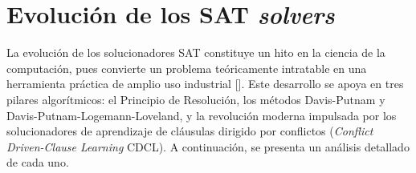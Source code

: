 




\section{Evoluci\'on de los SAT \textit{solvers}}
\label{sec:evolucion-sat-solvers}
La evoluci\'on de los solucionadores SAT constituye un hito en la ciencia de la computaci\'on, pues convierte un problema te\'oricamente intratable en una herramienta pr\'actica de amplio uso industrial [\cite{fichte2023silent}]. Este desarrollo se apoya en tres pilares algor\'itmicos: el Principio de Resoluci\'on, los m\'etodos Davis-Putnam y Davis-Putnam-Logemann-Loveland, y la revoluci\'on moderna impulsada por los solucionadores de aprendizaje de cl\'ausulas dirigido por conflictos (\textit{Conflict Driven-Clause Learning} CDCL). A continuaci\'on, se presenta un an\'alisis detallado de cada uno.

